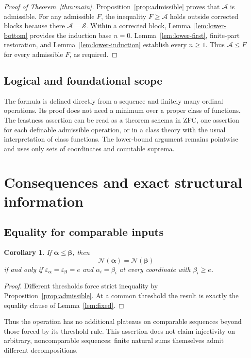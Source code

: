 \documentclass[11pt,letterpaper]{article}
\newtheorem{corollary}[theorem]{Corollary}
\theoremstyle{definition}
\theoremstyle{remark}
\newcommand{\Nop}{\mathcal N}
\newcommand{\Sop}{\mathcal S}
\newcommand{\Aop}{\mathcal A}
\newcommand{\seq}[1]{\boldsymbol{#1}}
\newcommand{\epsa}{\varepsilon_{\seq\alpha}}
\newcommand{\epsb}{\varepsilon_{\seq\beta}}
\begin{document}
\begin{proof}[Proof of Theorem~\ref{thm:main}]
Proposition~\ref{prop:admissible} proves that $\Aop$ is admissible. For any admissible $F$, the inequality $F\ge\Aop$ holds outside corrected blocks because there $\Aop=\Sop$. Within a corrected block, Lemma~\ref{lem:lower-bottom} provides the induction base $n=0$. Lemma~\ref{lem:lower-first}, finite-part restoration, and Lemma~\ref{lem:lower-induction} establish every $n\ge1$. Thus $\Aop\le F$ for every admissible $F$, as required.
\end{proof}

\subsection{Logical and foundational scope}

The formula is defined directly from a sequence and finitely many ordinal operations. Its proof does not need a minimum over a proper class of functions. The leastness assertion can be read as a theorem schema in ZFC, one assertion for each definable admissible operation, or in a class theory with the usual interpretation of class functions. The lower-bound argument remains pointwise and uses only sets of coordinates and countable suprema.

\section{Consequences and exact structural information}\label{sec:consequences}

\subsection{Equality for comparable inputs}

\begin{corollary}\label{cor:equality}
If $\seq\alpha\le\seq\beta$, then
\[
 \Nop(\seq\alpha)=\Nop(\seq\beta)
\]
if and only if $\epsa=\epsb=e$ and $\alpha_i=\beta_i$ at every coordinate with $\beta_i\ge e$.
\end{corollary}
\begin{proof}
Different thresholds force strict inequality by Proposition~\ref{prop:admissible}. At a common threshold the result is exactly the equality clause of Lemma~\ref{lem:fixed}.
\end{proof}

Thus the operation has no additional plateaus on comparable sequences beyond those forced by its threshold rule. This assertion does not claim injectivity on arbitrary, noncomparable sequences: finite natural sums themselves admit different decompositions.
\end{document}

